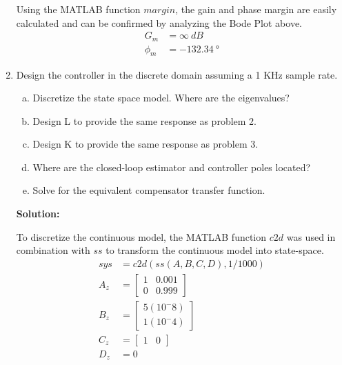 \documentclass[11pt]{article}
\newcommand{\solution}{\textbf{Solution: \\}}
\begin{document}
\begin{enumerate}[label=\textbf{\arabic*.}]
  Using the MATLAB function $margin$, the gain and phase margin are easily 
  calculated and can be confirmed by analyzing the Bode Plot above.
  \begin{equation}
    \begin{split}
      G_m &= \infty \:\si{dB} \\
      \phi_m &= -132.34 \:\si{\degree}
    \end{split}
  \end{equation}

  \vspace{24pt}
  \item Design the controller in the discrete domain assuming a 1 KHz sample rate.
  \begin{enumerate}[(a)]
    \itemsep -6pt
    \item Discretize the state space model. Where are the eigenvalues?
    \item Design L to provide the same response as problem 2.
    \item Design K to provide the same response as problem 3.
    \item Where are the closed-loop estimator and controller poles located?
    \item Solve for the equivalent compensator transfer function.
  \end{enumerate}
  \solution

  To discretize the continuous model, the MATLAB function $c2d$ was used in 
  combination with $ss$ to transform the continuous model into state-space.
  \begin{equation}
    \begin{split}
      sys &= c2d(ss(A,B,C,D), 1/1000) \\
      A_z &= 
      \begin{bmatrix}
        1 & 0.001 \\ 0 & 0.999
      \end{bmatrix} \\
      B_z &= 
      \begin{bmatrix}
        5(10^-8) \\ 1(10^-4)
      \end{bmatrix} \\
      C_z &=
      \begin{bmatrix}
        1 & 0
      \end{bmatrix} \\
      D_z &= 0
    \end{split}
  \end{equation}


\end{enumerate}
\end{document}

